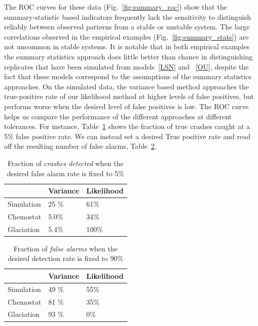 \documentclass[authoryear,review,11pt]{elsarticle}
\begin{document}
 The ROC curves for these data (Fig.~\ref{fig:summary_roc}) show that the summary-statistic based indicators
frequently lack the sensitivity to distinguish reliably between observed patterns from a stable or unstable system.
The large correlations observed in the empirical examples (Fig.~\ref{fig:summary_stats}) are not uncommon in stable systems.
It is notable that in both empirical examples the summary statistics approach does little better than chance in distinguishing 
replicates that have been simulated from models~\eqref{LSN} and ~\eqref{OU}, 
despite the fact that these models correspond 
to the assumptions of the summary statistics approaches.  
On the simulated data, the variance based method approaches the 
true-positive rate of our likelihood method at higher levels of false positives, 
but performs worse when the desired level of false positives is low.  
The ROC curve helps us compare the performance of the different approaches at different tolerances.  
For instance, Table~\ref{tab:falsepos} shows the fraction of true crashes caught at a 5\% false positive rate.
We can instead set a desired True positive rate and read off the resulting number of false alarms, Table~\ref{tab:truepos}.  

\begin{table}
  \begin{center}
    \begin{tabular}{l|l|l}
                  &  Variance & Likelihood \\ 
      \hline
      Simulation  & 25 \%     & 61\% \\
      Chemostat   & 5.0\%     & 34\% \\
      Glaciation  & 5.4\%     & 100\% 
    \end{tabular}
    \caption{Fraction of \emph{crashes detected} when the desired false alarm rate is fixed to 5\%}
    \label{tab:falsepos}
  \end{center}
\end{table}

\begin{table}
  \begin{center}
    \begin{tabular}{l|l|l}
                  &  Variance & Likelihood \\ 
      \hline
      Simulation  & 49 \%     & 55\% \\
      Chemostat   & 81 \%     & 35\% \\
      Glaciation  & 93 \%     & 0\% 
    \end{tabular}
    \caption{Fraction of \emph{false alarms} when the desired detection rate is fixed to 90\%}
    \label{tab:truepos}
  \end{center}
\end{table}
\end{document}
